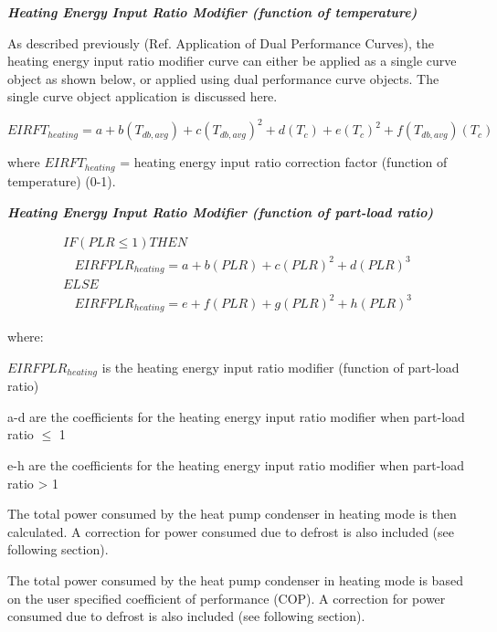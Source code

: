\emph{\textbf{Heating Energy Input Ratio Modifier (function of temperature)}}

As described previously (Ref. Application of Dual Performance Curves), the heating energy input ratio modifier curve can either be applied as a single curve object as shown below, or applied using dual performance curve objects. The single curve object application is discussed here.

\begin{equation}
  EIRFT_{heating} = a + b \left( T_{db,avg} \right) + c \left( T_{db,avg} \right)^2 + d \left( T_c \right) + e \left( T_c \right)^2 + f \left( T_{db,avg} \right) \left( T_c \right)
\end{equation}

where \(EIRFT_{heating}\) = heating energy input ratio correction factor (function of temperature) (0-1).

\emph{\textbf{Heating Energy Input Ratio Modifier (function of part-load ratio)}}

\begin{equation}
  \begin{array}{l}
    IF \left( PLR \leq 1 \right) THEN \\
    ~~~~EIRFPLR_{heating} = a + b \left( PLR \right) + c \left( PLR \right)^2 + d \left( PLR \right)^3 \\
    ELSE \\
    ~~~~EIRFPLR_{heating} = e + f \left( PLR \right) + g \left( PLR \right)^2 + h \left( PLR \right)^3
  \end{array}
\end{equation}

where:

\(EIRFPLR_{heating}\) is the heating energy input ratio modifier (function of part-load ratio)

a-d are the coefficients for the heating energy input ratio modifier when part-load ratio \(\leq\) 1

e-h are the coefficients for the heating energy input ratio modifier when part-load ratio > 1

The total power consumed by the heat pump condenser in heating mode is then calculated. A correction for power consumed due to defrost is also included (see following section).

The total power consumed by the heat pump condenser in heating mode is based on the user specified coefficient of performance (COP). A correction for power consumed due to defrost is also included (see following section).

